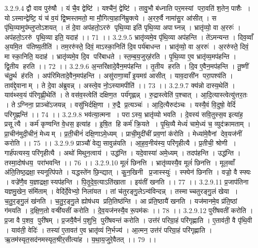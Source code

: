 3.2.9.4
द्वौ वाव पुरु॑षौ । यं चै॒व द्वेष्टि॑ । यश्चै॑नं॒ द्वेष्टि॑ । तावु॒भौ ब॑ध्नाति पर॒मस्यां परा॒वति॑ श॒तेन॒ पाशैः । योऽस्मान्द्वेष्टि॒ यं च॑ व॒यं द्वि॒ष्मस्तमतो॒ मा मौ॒गित्या॒हानि॑म्रुक्त्ये । अ॒ररु॒र्वै नामा॑सु॒र आ॑सीत् । स पृ॑थि॒व्यामुप॑म्लुप्तोऽशयत् । तं दे॒वा अप॑हतो॒ऽररु॑ पृथि॒व्या इति॑ पृथि॒व्या अपाघ्नन्न् । भ्रातृ॑व्यो॒ वा अ॒ररुः॑ । अप॑हतो॒ऽररु॑ पृथि॒व्या इति॒ यदाह॑ ।। 71 ।।
3.2.9.5
भ्रातृ॑व्यमे॒व पृ॑थि॒व्या अप॑हन्ति । ते॑ऽमन्यन्त । दिव॒व्वाँ अ॒यमि॒त प॑तिष्य॒तीति॑ । तम॒ररु॑स्ते॒ दिवं॒ माऽस्का॒निति॑ दि॒वपर्य॑बाधन्त । भ्रातृ॑व्यो॒ वा अ॒ररुः॑ । अ॒ररु॑स्ते॒ दिवं॒ मा स्का॒निति॒ यदाह॑ । भ्रातृ॑व्यमे॒व दि॒व परि॑बाधते । स्त॒म्ब॒य॒जुर्‌ह॑रति । पृ॒थि॒व्या ए॒व भ्रातृ॑व्य॒मप॑हन्ति । द्वि॒तीय॑ हरति ।। 72 ।।
3.2.9.6
अ॒न्तरि॑क्षादे॒वैन॒मप॑हन्ति । तृ॒तीय॑ हरति । दि॒व ए॒वैन॒मप॑हन्ति । तू॒ष्णीं च॑तु॒र्थ ह॑रति । अप॑रिमितादे॒वैन॒मप॑हन्ति । असु॑राणा॒व्वाँ इ॒यमग्र॑ आसीत् । याव॒दासी॑न परा॒पश्य॑ति । ताव॑द्दे॒वानाम् । ते दे॒वा अ॑ब्रुवन्न् । अस्त्वे॒व नो॒ऽस्यामपीति॑ ।। 73 ।।
3.2.9.7
क्य॑न्नो दास्य॒थेति॑ । याव॑थ्स्व॒यं प॑रिगृह्णी॒थेति॑ । ते वस॑व॒स्त्वेति॑ दक्षिण॒त पर्य॑गृह्णन्न् । रु॒द्रास्त्वेति॑ प॒श्चात् । आ॒दि॒त्यास्त्वेत्यु॑त्तर॒तः । तेऽग्निना॒ प्राञ्चो॑ऽजयन्न् । वसु॑भिर्दक्षि॒णा । रु॒द्रै प्र॒त्यञ्चः॑ । आ॒दि॒त्यैरुद॑ञ्चः । यस्यै॒वं वि॒दुषो॒ वेदिं॑ परिगृ॒ह्णन्ति॑ ।। 74 ।।
3.2.9.8
भव॑त्या॒त्मना । पराऽस्य॒ भ्रातृ॑व्यो भवति । दे॒वस्य॑ सवि॒तुस्स॒व इत्या॑ह॒ प्रसूत्यै । कर्म॑ कृण्वन्ति वे॒धस॒ इत्या॑ह । इ॒षि॒त हि कर्म॑ क्रि॒यते । पृ॒थि॒व्यै मेध्यं॑ चामे॒ध्यं च॒ व्युद॑क्रामताम् । प्रा॒चीन॑मुदी॒चीनं॒ मेध्यम् । प्र॒ती॒चीनं॑ दक्षि॒णाऽमे॒ध्यम् । प्राची॒मुदी॑चीं प्रव॒णां क॑रोति । मेध्या॑मे॒वैनां देव॒यज॑नीं करोति ।। 75 ।।
3.2.9.9
प्राञ्चौ॑ वेद्य॒॒सावुन्न॑यति । आ॒ह॒व॒नीय॑स्य॒ परि॑गृहीत्यै । प्र॒तीची॒ श्रोणी । गार्ह॑पत्यस्य॒ परि॑गृहीत्यै । अथो॑ मिथुन॒त्वाय॑ । उद्ध॑न्ति । यदे॒वास्या॑ अमे॒ध्यम् । तदप॑हन्ति । उद्ध॑न्ति । तस्मा॒दोष॑धय॒ परा॑भवन्ति ।। 76 ।।
3.2.9.10
मूलं॑ छिनत्ति । भ्रातृ॑व्यस्यै॒व मूलं॑ छिनत्ति । मूल॒व्वाँ अ॑ति॒तिष्ठ॒द्रक्षा॒॒स्यनूत्पि॑पते । यद्धस्ते॑न छि॒न्द्यात् । कु॒न॒खिनी प्र॒जास्स्युः॑ । स्फ्येन॑ छिनत्ति । वज्रो॒ वै स्फ्यः । वज्रे॑णै॒व य॒ज्ञाद्रक्षा॒॒स्यप॑हन्ति । पि॒तृ॒दे॒व॒त्याऽति॑खाता । इय॑तीं खनति ।। 77 ।।
3.2.9.11
प्र॒जाप॑तिना यज्ञमु॒खेन॒ संमि॑ताम् । वेदि॑र्दे॒वेभ्यो॒ निला॑यत । तां च॑तुरङ्गु॒लेऽन्व॑विन्दन्न् । तस्माच्चतुरङ्गु॒लं खेया । च॒तु॒र॒ङ्गु॒लं ख॑नति । च॒तु॒र॒ङ्गु॒ले ह्योष॑धय प्रति॒तिष्ठ॑न्ति । आ प्र॑ति॒ष्ठायै॑ खनति । यज॑मानमे॒व प्र॑ति॒ष्ठां ग॑मयति । द॒क्षि॒ण॒तो वऱ्षी॑यसीं करोति । दे॒व॒यज॑नस्यै॒व रू॒पम॑कः ।। 78 ।।
3.2.9.12
पुरी॑षवतीं करोति । प्र॒जा वै प॒शव॒ पुरी॑षम् । प्र॒जयै॒वैनं॑ प॒शुभि॒ पुरी॑षवन्तं करोति । उत्त॑रं परिग्रा॒हं परि॑गृह्णाति । ए॒ताव॑ती॒ वै पृ॑थि॒वी । याव॑ती॒ वेदिः॑ । तस्या॑ ए॒तावत॑ ए॒व भ्रातृ॑व्यं नि॒र्भज्य॑ । आ॒त्मन॒ उत्त॑रं परिग्रा॒हं परि॑गृह्णाति । ऋ॒तम॑स्यृत॒सद॑नमस्यृत॒श्रीर॒सीत्या॑ह । य॒था॒य॒जुरे॒वैतत् ।। 79 ।।
